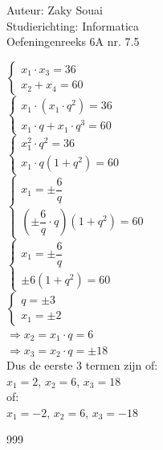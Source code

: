 \documentclass[a4paper]{article}
\begin{document}
  
\noindent \large Auteur: Zaky Souai \\
\noindent \large Studierichting:  Informatica\\
\noindent \large Oefeningenreeks 6A nr. 7.5\\

\bigskip

\normalsize

$ \left\{
\begin{array}{l}
    x_{1} \cdot x_{3} = 36 \\
    x_{2} + x_{4} = 60
\end{array}
\right.$ \\

$ \left\{
\begin{array}{l}
    x_{1} \cdot \left( x_{1} \cdot q^2\right) = 36 \\
    x_{1} \cdot q + x_{1} \cdot q^3 = 60
\end{array}
\right.$ \\

$ \left\{
\begin{array}{l}
    x_{1}^2 \cdot q^2 = 36 \\
    x_{1} \cdot q\left(1 + q^2\right) = 60
\end{array}
\right.$ \\

$ \left\{
\begin{array}{l}
    x_{1} = \pm \dfrac{6}{q} \\
    \left(\pm\dfrac{6}{q} \cdot q\right)(1 + q^2) = 60
\end{array}
\right.$ \\

$ \left\{
\begin{array}{l}
    x_{1} = \pm \dfrac{6}{q} \\
    \pm6\left(1 + q^2\right) = 60
\end{array}
\right.$ \\

$ \left\{
\begin{array}{l}
    q = \pm 3 \\
    x_{1} = \pm 2
\end{array}
\right.$ \\

$\Rightarrow x_{2} = x_{1} \cdot q = 6$\\

$\Rightarrow x_{3} = x_{2} \cdot q = \pm 18$\\

Dus de eerste 3 termen zijn of:\\

$x_{1} = 2$, $x_{2} = 6$, $x_{3} = 18$ \\

of:\\

$x_{1} = -2$, $x_{2} = 6$, $x_{3} = -18$ \\




\begin{thebibliography}{999}
\end{thebibliography}
\end{document}
